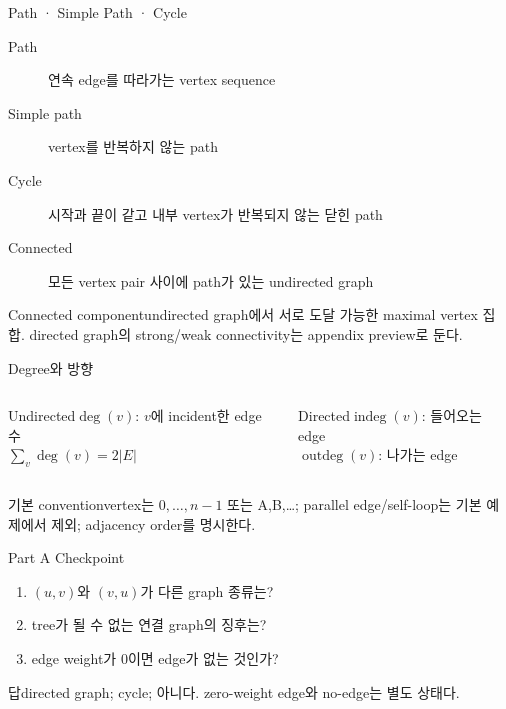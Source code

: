 \begin{frame}{Path · Simple Path · Cycle}
\begin{description}\item[Path]연속 edge를 따라가는 vertex sequence\item[Simple path]vertex를 반복하지 않는 path\item[Cycle]시작과 끝이 같고 내부 vertex가 반복되지 않는 닫힌 path\item[Connected]모든 vertex pair 사이에 path가 있는 undirected graph\end{description}
\begin{block}{Connected component}undirected graph에서 서로 도달 가능한 maximal vertex 집합. directed graph의 strong/weak connectivity는 appendix preview로 둔다.\end{block}
\end{frame}
\begin{frame}{Degree와 방향}
\begin{columns}[T]\begin{block}{Undirected}$\deg(v)$: $v$에 incident한 edge 수\\$\sum_v\deg(v)=2|E|$\end{block}
\begin{block}{Directed}$\operatorname{indeg}(v)$: 들어오는 edge\\$\operatorname{outdeg}(v)$: 나가는 edge\end{block}\end{columns}
\begin{alertblock}{기본 convention}vertex는 $0,\ldots,n-1$ 또는 A,B,\ldots; parallel edge/self-loop는 기본 예제에서 제외; adjacency order를 명시한다.\end{alertblock}
\end{frame}
\begin{frame}{Part A Checkpoint}
\begin{enumerate}\item $(u,v)$와 $(v,u)$가 다른 graph 종류는?\item tree가 될 수 없는 연결 graph의 징후는?\item edge weight가 0이면 edge가 없는 것인가?\end{enumerate}
\begin{exampleblock}{답}directed graph; cycle; 아니다. zero-weight edge와 no-edge는 별도 상태다.\end{exampleblock}
\end{frame}
